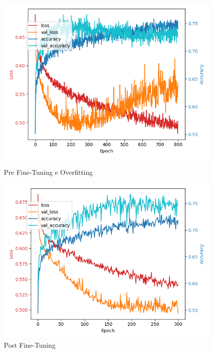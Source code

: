 \begin{figure}[H]
    \centering
    \begin{minipage}[b]{0.45\linewidth}
        \centering
        \includegraphics[width=\linewidth]{img/final800.png}
        \caption{Pre Fine-Tuning e Overfitting}
        \label{fig:first_label}
    \end{minipage}
    \hspace{0.05\linewidth}
    \begin{minipage}[b]{0.45\linewidth}
        \centering
        \includegraphics[width=\linewidth]{img/final_mlp.png}
        \caption{Post Fine-Tuning}
        \label{fig:second_label}
    \end{minipage}
\end{figure}

